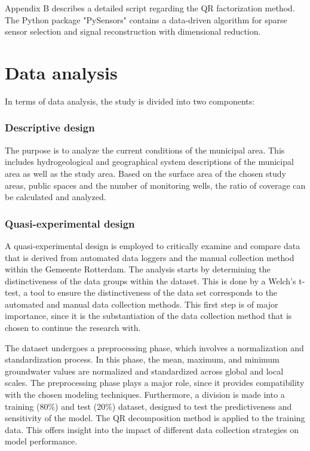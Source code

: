 Appendix B describes a detailed script regarding the QR factorization method. The Python package "PySensors" contains a data-driven algorithm for sparse sensor selection and signal reconstruction with dimensional reduction.

\section{Data analysis}
In terms of data analysis, the study is divided into two components:

\subsubsection{Descriptive design}
The purpose is to analyze the current conditions of the municipal area. This includes hydrogeological and geographical system descriptions of the municipal area as well as the study area. Based on the surface area of the chosen study areas, public spaces and the number of monitoring wells, the ratio of coverage can be calculated and analyzed.

\subsubsection{Quasi-experimental design}
A quasi-experimental design is employed to critically examine and compare data that is derived from automated data loggers and the manual collection method within the Gemeente Rotterdam. The analysis starts by determining the distinctiveness of the data groups within the dataset. This is done by a Welch’s t-test, a tool to ensure the distinctiveness of the data set corresponds to the automated and manual data collection methods. This first step is of major importance, since it is the substantiation of the data collection method that is chosen to continue the research with. 

The dataset undergoes a preprocessing phase, which involves a normalization and standardization process. In this phase, the mean, maximum, and minimum groundwater values are normalized and standardized across global and local scales. The preprocessing phase plays a major role, since it provides compatibility with the chosen modeling techniques. Furthermore, a division is made into a training (80\%) and test (20\%) dataset, designed to test the predictiveness and sensitivity of the model. The QR decomposition method is applied to the training data. This offers insight into the impact of different data collection strategies on model performance. 

